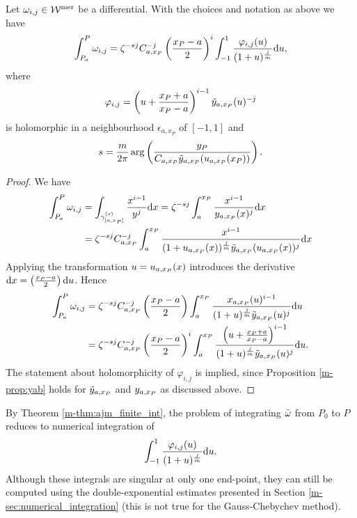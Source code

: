\documentclass[main.tex]{subfiles}
\begin{document}
  \begin{thm}\label{thm:ajm_finite_int}
  Let $\omega_{i,j} \in \mathcal{W}^{\text{mer}}$ be a differential. With the choices and notation as above we have
 \begin{equation*}\label{eq:aj_int}
       \int_{P_a}^P \omega_{i,j} = \zeta^{-sj} C_{a,x_P}^{-j} \left(\frac{x_P-a}{2}\right)^i \int_{-1}^1 \frac{\varphi_{i,j}(u)}{(1+u)^{\frac{j}{m}}}  \mathrm d u,
  \end{equation*}
   where
   \begin{equation*}
    \varphi_{i,j}  = \left(u+\frac{x_P+a}{x_P-a}\right)^{i-1} \tilde{y}_{a,x_P}(u)^{-j}
   \end{equation*}
   is holomorphic in a neighbourhood $\epsilon_{a,x_P}$ of $[-1,1]$
   and
   \begin{equation*}
   s = \frac{m}{2\pi} \arg\left(  \frac{y_P}{C_{a,x_P} \tilde{y}_{a,x_P}( u_{a,x_P}(x_P) )} \right).
   \end{equation*}
  \end{thm}
  \begin{proof}
    We have
    \begin{align*}
     \int_{P_a}^P \omega_{i,j}  & =  \int_{\gamma^{(s)}_{[a,x_P]}} \frac{x^{i-1}}{y^j}  \mathrm d x  =  \zeta^{-sj} \int_a^{x_P} \frac{x^{i-1}}{y_{a,x_P}(x)^j}  \mathrm d x \\  & =
     \zeta^{-sj} C_{a,x_P}^{-j}  \int_a^{x_P} \frac{x^{i-1}}{(1+u_{a,x_P}(x))^{\frac{j}{m}}\tilde{y}_{a,x_P}(u_{a,x_P}(x))^j}  \mathrm d x
  \end{align*}
   Applying the transformation $u = u_{a,x_P}(x)$ introduces the derivative $\mathrm d x = \left(\frac{x_P-a}{2}\right) \mathrm d u$. Hence
  \begin{align*}
    \int_{P_a}^P \omega_{i,j} & =  \zeta^{-sj} C_{a,x_P}^{-j} \left(\frac{x_P-a}{2}\right) \int_a^{x_P} \frac{x_{a,x_P}(u)^{i-1}}{(1+u)^{\frac{j}{m}}\tilde{y}_{a,x_P}(u)^j}  \mathrm d u \\ & =
   \zeta^{-sj} C_{a,x_P}^{-j} \left(\frac{x_P-a}{2}\right)^i \int_a^{x_P} \frac{\left(u + \frac{x_P+a}{x_P-a}\right)^{i-1}}{(1+u)^{\frac{j}{m}}\tilde{y}_{a,x_P}(u)^j}  \mathrm d u.
  \end{align*}
  The statement about holomorphicity of $\varphi_{i,j}$ is implied, since
  Proposition \ref{m-prop:yab} holds for $\tilde{y}_{a,x_P}$ and $y_{a,x_P}$ as discussed
  above.
  \end{proof}

  \begin{rmk}\label{rmk:ajm_finite_int}
   By Theorem \ref{m-thm:ajm_finite_int}, the problem of integrating $\bar{\omega}$ from $P_0$ to $P$ reduces to numerical integration of
    \begin{equation*}
       \int_{-1}^1 \frac{\varphi_{i,j}(u)}{(1+u)^{\frac{j}{m}}}  \mathrm d u.
   \end{equation*}
   Although these integrals are singular at only one end-point, they
   can still  be computed using the double-exponential estimates presented in Section
   \ref{m-sec:numerical_integration} (this is not true for the Gauss-Chebychev method).
   \end{rmk}
\end{document}

